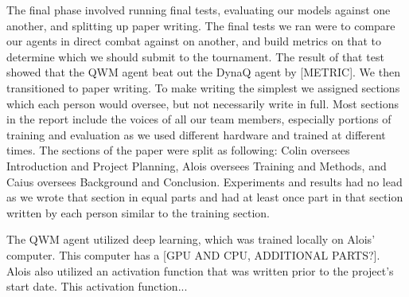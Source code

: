 \documentclass[article, 10pt]{IEEEtran}
\begin{document}
The final phase involved running final tests, evaluating our models against one another, and splitting up paper writing. The final tests we ran were to compare our agents in direct combat against on another, and build metrics on that to determine which we should submit to the tournament. The result of that test showed that the QWM agent beat out the DynaQ agent by [METRIC]. We then transitioned to paper writing. To make writing the simplest we assigned sections which each person would oversee, but not necessarily write in full. Most sections in the report include the voices of all our team members, especially portions of training and evaluation as we used different hardware and trained at different times. The sections of the paper were split as following: Colin oversees Introduction and Project Planning, Alois oversees Training and Methods, and Caius oversees Background and Conclusion. Experiments and results had no lead as we wrote that section in equal parts and had at least once part in that section written by each person similar to the training section.

The QWM agent utilized deep learning, which was trained locally on Alois' computer. This computer has a [GPU AND CPU, ADDITIONAL PARTS?]. Alois also utilized an activation function that was written prior to the project's start date. This activation function...





\end{document}
